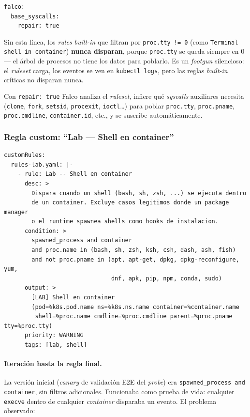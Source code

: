 \begin{lstlisting}[style=yaml]
falco:
  base_syscalls:
    repair: true
\end{lstlisting}

Sin esta línea, los \emph{rules built-in} que filtran por \texttt{proc.tty != 0} (como \texttt{Terminal shell in container}) \textbf{nunca disparan}, porque \texttt{proc.tty} se queda siempre en 0 --- el árbol de procesos no tiene los datos para poblarlo. Es un \emph{footgun} silencioso: el \emph{ruleset} carga, los eventos se ven en \texttt{kubectl logs}, pero las reglas \emph{built-in} críticas no disparan nunca.

Con \texttt{repair: true} Falco analiza el \emph{ruleset}, infiere qué \emph{syscalls} auxiliares necesita (\texttt{clone}, \texttt{fork}, \texttt{setsid}, \texttt{procexit}, \texttt{ioctl}\dots) para poblar \texttt{proc.tty}, \texttt{proc.pname}, \texttt{proc.cmdline}, \texttt{container.id}, etc., y se suscribe automáticamente.

\subsubsection{Regla custom: ``Lab --- Shell en container''}

\begin{lstlisting}[style=yaml]
customRules:
  rules-lab.yaml: |-
    - rule: Lab -- Shell en container
      desc: >
        Dispara cuando un shell (bash, sh, zsh, ...) se ejecuta dentro
        de un container. Excluye casos legitimos donde un package manager
        o el runtime spawnea shells como hooks de instalacion.
      condition: >
        spawned_process and container
        and proc.name in (bash, sh, zsh, ksh, csh, dash, ash, fish)
        and not proc.pname in (apt, apt-get, dpkg, dpkg-reconfigure, yum,
                               dnf, apk, pip, npm, conda, sudo)
      output: >
        [LAB] Shell en container
        (pod=%k8s.pod.name ns=%k8s.ns.name container=%container.name
         shell=%proc.name cmdline=%proc.cmdline parent=%proc.pname tty=%proc.tty)
      priority: WARNING
      tags: [lab, shell]
\end{lstlisting}

\paragraph{Iteración hasta la regla final.} La versión inicial (\emph{canary} de validación E2E del \emph{probe}) era \texttt{spawned\_process and container}, sin filtros adicionales. Funcionaba como prueba de vida: cualquier \texttt{execve} dentro de cualquier \emph{container} disparaba un evento. El problema observado:

